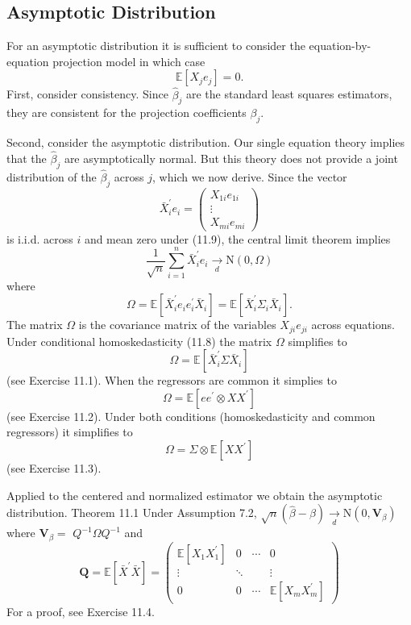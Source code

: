 \documentclass[10pt]{article}
\begin{document}
\subsection{Asymptotic Distribution}
For an asymptotic distribution it is sufficient to consider the equation-by-equation projection model in which case
$$
\mathbb{E}\left[X_{j} e_{j}\right]=0 .
$$
First, consider consistency. Since $\widehat{\beta}_{j}$ are the standard least squares estimators, they are consistent for the projection coefficients $\beta_{j}$.

Second, consider the asymptotic distribution. Our single equation theory implies that the $\widehat{\beta}_{j}$ are asymptotically normal. But this theory does not provide a joint distribution of the $\widehat{\beta}_{j}$ across $j$, which we now derive. Since the vector
$$
\bar{X}_{i}^{\prime} e_{i}=\left(\begin{array}{c}
X_{1 i} e_{1 i} \\
\vdots \\
X_{m i} e_{m i}
\end{array}\right)
$$
is i.i.d. across $i$ and mean zero under (11.9), the central limit theorem implies
$$
\frac{1}{\sqrt{n}} \sum_{i=1}^{n} \bar{X}_{i}^{\prime} e_{i} \underset{d}{\longrightarrow} \mathrm{N}(0, \Omega)
$$
where
$$
\Omega=\mathbb{E}\left[\bar{X}_{i}^{\prime} e_{i} e_{i}^{\prime} \bar{X}_{i}\right]=\mathbb{E}\left[\bar{X}_{i}^{\prime} \Sigma_{i} \bar{X}_{i}\right] .
$$
The matrix $\Omega$ is the covariance matrix of the variables $X_{j i} e_{j i}$ across equations. Under conditional homoskedasticity (11.8) the matrix $\Omega$ simplifies to
$$
\Omega=\mathbb{E}\left[\bar{X}_{i}^{\prime} \Sigma \bar{X}_{i}\right]
$$
(see Exercise 11.1). When the regressors are common it simplies to
$$
\Omega=\mathbb{E}\left[e e^{\prime} \otimes X X^{\prime}\right]
$$
(see Exercise 11.2). Under both conditions (homoskedasticity and common regressors) it simplifies to
$$
\Omega=\Sigma \otimes \mathbb{E}\left[X X^{\prime}\right]
$$
(see Exercise 11.3).

Applied to the centered and normalized estimator we obtain the asymptotic distribution. Theorem 11.1 Under Assumption 7.2, $\sqrt{n}(\widehat{\beta}-\beta) \underset{d}{\longrightarrow} \mathrm{N}\left(0, \boldsymbol{V}_{\beta}\right)$ where $\boldsymbol{V}_{\beta}=$ $Q^{-1} \Omega Q^{-1}$ and
$$
\boldsymbol{Q}=\mathbb{E}\left[\bar{X}^{\prime} \bar{X}\right]=\left(\begin{array}{cccc}
\mathbb{E}\left[X_{1} X_{1}^{\prime}\right] & 0 & \cdots & 0 \\
\vdots & \ddots & & \vdots \\
0 & 0 & \cdots & \mathbb{E}\left[X_{m} X_{m}^{\prime}\right]
\end{array}\right)
$$
For a proof, see Exercise 11.4.
\end{document}
